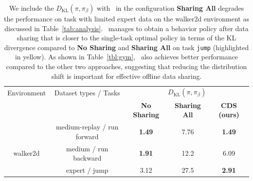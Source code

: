 \begin{table}
  \centering
  \scriptsize
  \def\arraystretch{0.9}
  \setlength{\tabcolsep}{0.42em}
\begin{tabularx}{0.95\linewidth}{cc|ccc}
  \toprule
 \multicolumn{1}{c}{\multirow{1.5}[2]{*}{Environment}} & \multicolumn{1}{c}{\multirow{1.5}[2]{*}{Dataset types / Tasks}}\vline &
 \multicolumn{3}{c}{$D_\text{KL}(\pi, \pi_\beta)$}\\
& \multicolumn{1}{c}{} \vline& \multicolumn{1}{c}{\textbf{No Sharing}}  & \multicolumn{1}{c}{\textbf{Sharing All}}  & \multicolumn{1}{c}{\textbf{CDS (ours)}}\\
\midrule
  &medium-replay / run forward & \textbf{1.49} & 7.76 & \textbf{1.49}\\
  walker2d&medium / run backward &  \textbf{1.91} & 12.2 & 6.09\\
  & \cellcolor{yellow} expert / jump & \cellcolor{yellow} 3.12 & \cellcolor{yellow} 27.5 & \cellcolor{yellow} \textbf{2.91}\\
    \bottomrule
    \end{tabularx}
    \vspace{-0.2cm}
         \caption{\footnotesize We include the $D_\text{KL}(\pi, \pi_\beta)$ with \methodname\ in the configuration \textbf{Sharing All} degrades the performance on task  with limited expert data on the walker2d environment as discussed in Table~\ref{tab:analysis}. \methodname\ manages to obtain a behavior policy after data sharing that is closer to the single-task optimal policy in terms of the KL divergence compared to \textbf{No Sharing} and \textbf{Sharing All} on task \texttt{jump} (highlighted in yellow). As shown in Table~\ref{tbl:gym}, \methodname\ also achieves better performance compared to the other two approaches, suggesting that reducing the distribution shift is important for effective offline data sharing.
     \label{tab:analysis_cds}
     \vspace{-0.6cm}
     }
\end{table}

